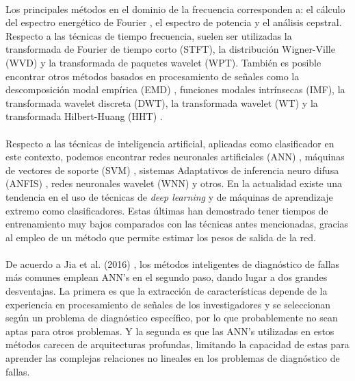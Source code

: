 \documentclass[12pt]{article}
\begin{document}
\paragraph{}
Los principales métodos en el dominio de la frecuencia corresponden a: el cálculo del espectro energético de Fourier \cite{jia}, el espectro de potencia \cite{li} y el análisis cepstral. Respecto a las  técnicas de tiempo frecuencia, suelen ser utilizadas la transformada de Fourier de tiempo corto (STFT), la distribución Wigner-Ville (WVD) y la transformada de paquetes wavelet (WPT). También es posible encontrar otros métodos basados en procesamiento de señales como la descomposición modal empírica (EMD) \cite{yu}, funciones modales intrínsecas (IMF), la transformada wavelet discreta (DWT), la transformada wavelet (WT) \cite{chang} y la transformada Hilbert-Huang (HHT) \cite{rai}.

\paragraph{}
Respecto a las técnicas de inteligencia artificial, aplicadas como clasificador en este contexto, podemos encontrar redes neuronales artificiales (ANN) \cite{ali}, máquinas de vectores de soporte (SVM) \cite{konar}, sistemas Adaptativos de inferencia neuro difusa (ANFIS) \cite{issam}, redes neuronales wavelet (WNN) \cite{wu} y otros. En la actualidad existe una tendencia en el uso de técnicas de \textit{deep learning} y de máquinas de aprendizaje extremo \cite{nibaldo,mao} como clasificadores. Estas últimas han demostrado tener tiempos de entrenamiento muy bajos comparados con las técnicas antes mencionadas, gracias al empleo de un método que permite estimar los pesos de salida de la red.

\paragraph{}
De acuerdo a Jia et al. (2016) \cite{jia}, los métodos inteligentes de diagnóstico de fallas más comunes emplean ANN's en el segundo paso, dando lugar a dos grandes desventajas. La primera es que la extracción de características depende de la experiencia en procesamiento de señales de los investigadores y se seleccionan según un problema de diagnóstico específico, por lo que probablemente no sean aptas para otros problemas. Y la segunda es que las ANN's utilizadas en estos métodos carecen de arquitecturas profundas, limitando la capacidad de estas para aprender las complejas relaciones no lineales en los problemas de diagnóstico de fallas.
\end{document}

